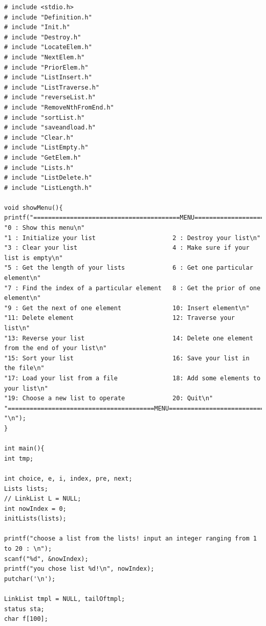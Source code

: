 \documentclass[supercite]{Experimental_Report}
\theoremstyle{definition}
\begin{document}
\noindent

\begin{lstlisting}[title = Main.cpp]
# include <stdio.h>
# include "Definition.h"
# include "Init.h"
# include "Destroy.h"
# include "LocateElem.h"
# include "NextElem.h"
# include "PriorElem.h"
# include "ListInsert.h"
# include "ListTraverse.h"
# include "reverseList.h"
# include "RemoveNthFromEnd.h"
# include "sortList.h"
# include "saveandload.h"
# include "Clear.h"
# include "ListEmpty.h"
# include "GetElem.h"
# include "Lists.h"
# include "ListDelete.h"
# include "ListLength.h"

void showMenu(){
printf("========================================MENU===================================================\n"
"0 : Show this menu\n"
"1 : Initialize your list                     2 : Destroy your list\n"
"3 : Clear your list                          4 : Make sure if your list is empty\n"
"5 : Get the length of your lists             6 : Get one particular element\n"
"7 : Find the index of a particular element   8 : Get the prior of one element\n"
"9 : Get the next of one element              10: Insert element\n"
"11: Delete element                           12: Traverse your list\n"
"13: Reverse your list                        14: Delete one element from the end of your list\n"
"15: Sort your list                           16: Save your list in the file\n"
"17: Load your list from a file               18: Add some elements to your list\n"
"19: Choose a new list to operate             20: Quit\n"
"========================================MENU===================================================\n"
"\n");
}

int main(){
int tmp;
	
int choice, e, i, index, pre, next;
Lists lists;
// LinkList L = NULL;
int nowIndex = 0;
initLists(lists);

printf("choose a list from the lists! input an integer ranging from 1 to 20 : \n");
scanf("%d", &nowIndex);
printf("you chose list %d!\n", nowIndex);
putchar('\n');

LinkList tmpl = NULL, tailOftmpl;
status sta;
char f[100];


\end{lstlisting}
\end{document}

